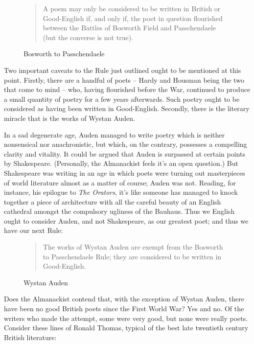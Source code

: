 \documentclass[0main.tex]{subfiles}
\begin{document}
\begin{figure}[h]
\caption{Bosworth to Passchendaele}
\begin{quote}
A poem may only be considered to be written in British or Good-English if, and only if, the poet in question flourished between the Battles of Bosworth Field and Passchendaele (but the converse is not true).
\end{quote}
\end{figure}

Two important caveats to the Rule just outlined ought to be mentioned at this point. Firstly, there are a handful of poets -- Hardy and Housman being the two that come to mind -- who, having flourished before the War, continued to produce a small quantity of poetry for a few years afterwards. Such poetry ought to be considered as having been written in Good-English. Secondly, there is the literary miracle that is the works of Wystan Auden.

In a sad degenerate age, Auden managed to write poetry which is neither nonsensical nor anachronistic, but which, on the contrary, possesses a compelling clarity and vitality. It could be argued that Auden is surpassed at certain points by Shakespeare. (Personally, the Almanackist feels it's an open question.) But Shakespeare was writing in an age in which poets were turning out masterpieces of world literature almost as a matter of course; Auden was not. Reading, for instance, his epilogue to \emph{The Orators}, it's like someone has managed to knock together a piece of architecture with all the careful beauty of an English cathedral amongst the compulsory ugliness of the Bauhaus. Thus we English ought to consider Auden, and not Shakespeare, as our greatest poet; and thus we have our next Rule:

\begin{figure}[h]
\caption{Wystan Auden}
\begin{quote}
The works of Wystan Auden are exempt from the Bosworth to Passchendaele Rule; they are considered to be written in Good-English.
\end{quote}
\end{figure}

Does the Almanackist contend that, with the exception of Wystan Auden, there have been no good British poets since the First World War? Yes and no. Of the writers who made the attempt, some were very good, but none were really poets. Consider these lines of Ronald Thomas, typical of the best late twentieth century British literature:\\
\end{document}
